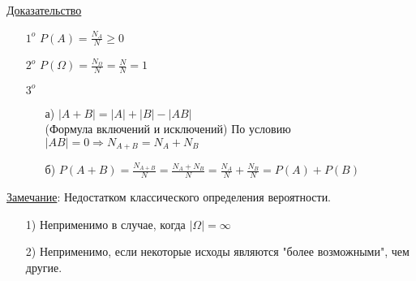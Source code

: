 \underline{Доказательство}
\begin{enumerate}
	\item[$1^o$]
	$P(A) = \frac{N_A}{N} \geqslant 0$
	
	\item[$2^o$]
	$P(\Omega) = \frac{N_{\Omega}}{N} = \frac{N}{N} = 1$
	
	\item[$3^o$]
	\begin{enumerate}
		\item[а)]
		$|A+B| = |A| + |B| - |AB|$ \\
		(Формула включений и исключений)
		По условию $|AB| = 0 \Rightarrow N_{A+B} = N_A + N_B$
		
		\item[б)]
		$P(A+B) = \frac{N_{A+B}}{N} = \frac{N_A + N_B}{N} = \frac{N_A}{N} + \frac{N_B}{N} = P(A) + P(B)$
	\end{enumerate}
\end{enumerate}

\underline{Замечание}: Недостатком классического определения вероятности.
\begin{enumerate}
	\item[1)] 
	Неприменимо в случае, когда $|\Omega| = \infty$
	
	\item[2)]
	Неприменимо, если некоторые исходы являются "более возможными", чем другие.
\end{enumerate}





































